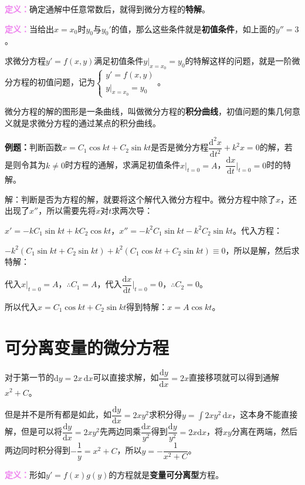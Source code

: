 \documentclass[UTF8, 12pt]{ctexart}
\begin{document}
\textcolor{violet}{\textbf{定义：}}确定通解中任意常数后，就得到微分方程的\textbf{特解}。

\textcolor{violet}{\textbf{定义：}}当给出$x=x_0$时$y_0$与$y_0'$的值，那么这些条件就是\textbf{初值条件}，如上面的$y''=3$。

求微分方程$y'=f(x,y)$满足初值条件$y\vert_{x=x_0}=y_0$的特解这样的问题，就是一阶微分方程的初值问题，记为$\left\{\begin{array}{l}
    y'=f(x,y) \\
    y\vert_{x=x_0}=y_0
\end{array}
\right.$。

微分方程的解的图形是一条曲线，叫做微分方程的\textbf{积分曲线}，初值问题的集几何意义就是求微分方程的通过某点的积分曲线。

\textbf{例题：}判断函数$x=C_1\cos kt+C_2\sin kt$是否是微分方程$\dfrac{\textrm{d}^2x}{\textrm{d}t^2}+k^2x=0$的解，若是则令其为$k\neq0$时方程的通解，求满足初值条件$x\vert_{t=0}=A$，$\dfrac{\textrm{d}x}{\textrm{d}t}\bigg\vert_{t=0}=0$时的特解。

解：判断是否为方程的解，就要将这个解代入微分方程中。微分方程中除了$x$，还出现了$x''$，所以需要先将$x$对$t$求两次导：

$x'=-kC_1\sin kt+kC_2\cos kt$，$x''=-k^2C_1\sin kt-k^2C_2\sin kt$。代入方程：

$-k^2(C_1\sin kt+C_2\sin kt)+k^2(C_1\cos kt+C_2\sin kt)\equiv0$，所以是解，然后求特解：

代入$x\vert_{t=0}=A$，$\therefore C_1=A$，代入$\dfrac{\textrm{d}x}{\textrm{d}t}\bigg\vert_{t=0}=0$，$\therefore C_2=0$。

所以代入$x=C_1\cos kt+C_2\sin kt$得到特解：$x=A\cos kt$。

\section{可分离变量的微分方程}

对于第一节的$\textrm{d}y=2x\,\textrm{d}x$可以直接求解，如$\dfrac{\textrm{d}y}{\textrm{d}x}=2x$直接移项就可以得到通解$x^2+C$。

但是并不是所有都是如此，如$\dfrac{\textrm{d}y}{\textrm{d}x}=2xy^2$求积分得$y=\int2xy^2\,\textrm{d}x$，这本身不能直接解，但是可以将$\dfrac{\textrm{d}y}{\textrm{d}x}=2xy^2$先两边同乘$\dfrac{\textrm{d}x}{y^2}$得到$\dfrac{\textrm{d}y}{y^2}=2x\textrm{d}x$，将$xy$分离在两端，然后两边同时积分得到$-\dfrac{1}{y}=x^2+C$，所以$y=-\dfrac{1}{x^2+C}$。

\textcolor{violet}{\textbf{定义：}}形如$y'=f(x)g(y)$的方程就是\textbf{变量可分离型}方程。
\end{document}
